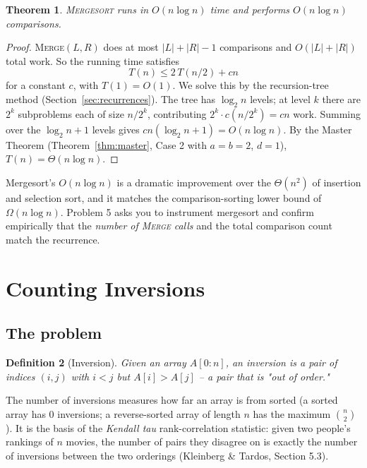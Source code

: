 \documentclass[11pt]{article}
\newtheorem{theorem}{Theorem}[section]
\newtheorem{definition}[theorem]{Definition}
\begin{document}
\begin{theorem}
\label{thm:mergesort-time}
\textsc{Mergesort} runs in $O(n \log n)$ time and performs $O(n \log n)$ comparisons.
\end{theorem}

\begin{proof}
\textsc{Merge}$(L, R)$ does at most $|L| + |R| - 1$ comparisons and $O(|L| + |R|)$ total
work. So the running time satisfies
\[
    T(n) \le 2\,T(n/2) + cn
\]
for a constant $c$, with $T(1) = O(1)$. We solve this by the recursion-tree method
(Section~\ref{sec:recurrences}). The tree has $\log_2 n$ levels; at level $k$ there are
$2^k$ subproblems each of size $n/2^k$, contributing $2^k \cdot c(n/2^k) = cn$ work. Summing
over the $\log_2 n + 1$ levels gives $cn(\log_2 n + 1) = O(n \log n)$. By the Master Theorem
(Theorem~\ref{thm:master}, Case 2 with $a = b = 2$, $d = 1$), $T(n) = \Theta(n \log n)$.
\end{proof}

Mergesort's $O(n \log n)$ is a dramatic improvement over the $\Theta(n^2)$ of insertion and
selection sort, and it matches the comparison-sorting lower bound of $\Omega(n \log n)$.
Problem 5 asks you to instrument mergesort and confirm empirically that the \emph{number of
\textsc{Merge} calls} and the total comparison count match the recurrence.

\section{Counting Inversions}

\subsection{The problem}

\begin{definition}[Inversion]
Given an array $A[0\mathbin{:}n]$, an \emph{inversion} is a pair of indices $(i, j)$ with
$i < j$ but $A[i] > A[j]$ -- a pair that is "out of order."
\end{definition}

The number of inversions measures how far an array is from sorted (a sorted array has $0$
inversions; a reverse-sorted array of length $n$ has the maximum $\binom{n}{2}$). It is the
basis of the \emph{Kendall tau} rank-correlation statistic: given two people's rankings of
$n$ movies, the number of pairs they disagree on is exactly the number of inversions
between the two orderings (Kleinberg \& Tardos, Section 5.3).
\end{document}
